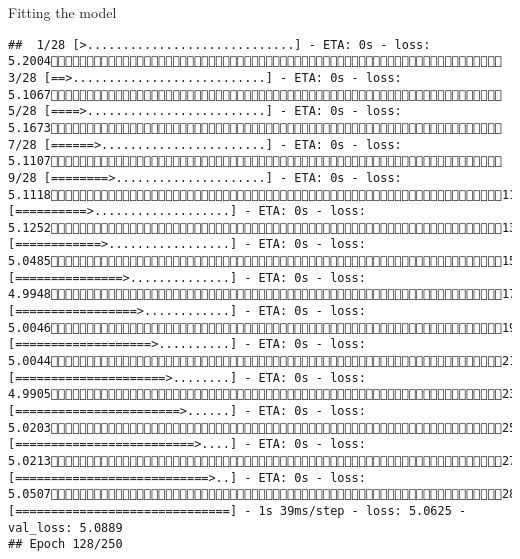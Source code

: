 \documentclass[
  ignorenonframetext,
]{beamer}
\begin{document}
\begin{frame}[fragile]{Fitting the model}
\begin{verbatim}
##  1/28 [>.............................] - ETA: 0s - loss: 5.2004 3/28 [==>...........................] - ETA: 0s - loss: 5.1067 5/28 [====>.........................] - ETA: 0s - loss: 5.1673 7/28 [======>.......................] - ETA: 0s - loss: 5.1107 9/28 [========>.....................] - ETA: 0s - loss: 5.111811/28 [==========>...................] - ETA: 0s - loss: 5.125213/28 [============>.................] - ETA: 0s - loss: 5.048515/28 [===============>..............] - ETA: 0s - loss: 4.994817/28 [=================>............] - ETA: 0s - loss: 5.004619/28 [===================>..........] - ETA: 0s - loss: 5.004421/28 [=====================>........] - ETA: 0s - loss: 4.990523/28 [=======================>......] - ETA: 0s - loss: 5.020325/28 [=========================>....] - ETA: 0s - loss: 5.021327/28 [===========================>..] - ETA: 0s - loss: 5.050728/28 [==============================] - 1s 39ms/step - loss: 5.0625 - val_loss: 5.0889
## Epoch 128/250

\end{verbatim}
\end{frame}
\end{document}
